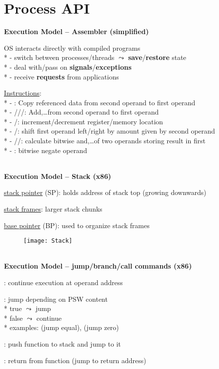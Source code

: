 \section{Process API}

\textbf{Execution Model -- Assembler (simplified)}
\begin{items}
  \item OS interacts directly with compiled programs \\*
    - switch between processes/threads \( \leadsto \) \textbf{save}/\textbf{restore} state \\*
    - deal with/pass on \textbf{signals}/\textbf{exceptions} \\*
    - receive \textbf{requests} from applications
  \item \underline{Instructions}: \\*
    - : Copy referenced data from second operand to first operand \\*
    - ///: Add,\dots from second operand to first operand \\*
    - /: increment/decrement register/memory location \\*
    - /: shift first operand left/right by amount given by second operand \\*
    - //: calculate bitwise and,\dots of two operands storing result in first \\*
    - : bitwise negate operand
\end{items}

\ \\
\textbf{Execution Model -- Stack (x86)}
\begin{items}
  \item \underline{stack pointer} (SP): holds address of stack top (growing downwards)
  \item \underline{stack frames}: larger stack chunks
  \item \underline{base pointer} (BP): used to organize stack frames
\end{items}

\begin{figure}[H]\centering\label{Stack}\texttt{[image: Stack]}\end{figure}

\ \\
\textbf{Execution Model -- jump/branch/call commands (x86)}
\begin{items}
  \item {}: continue execution at operand address
  \item {}: jump depending on PSW content \\*
    true \( \leadsto \) jump \\*
    false \( \leadsto \) continue \\*
    examples:  (jump equal),  (jump zero)
  \item {}: push function to stack and jump to it
  \item {}: return from function (jump to return address)
\end{items}

